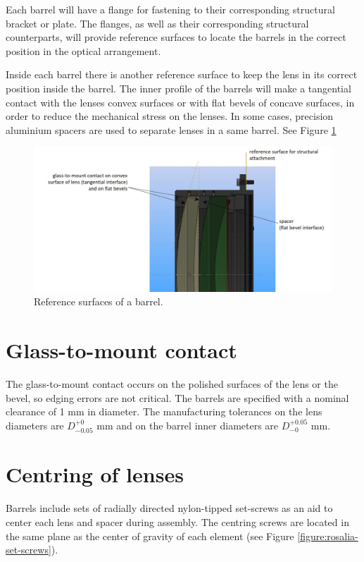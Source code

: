 \documentclass{report}
\begin{document}
Each barrel will have a flange for fastening to their corresponding structural bracket or plate. The flanges, as well as their corresponding structural counterparts, will provide reference surfaces to locate the barrels in the correct position in the optical arrangement.

Inside each barrel there is another reference surface to keep the lens in its correct position inside the barrel. The inner profile of the barrels will make a tangential contact with the lenses convex surfaces or with flat bevels of concave surfaces, in order to reduce the mechanical stress on the lenses. In some cases, precision aluminium spacers are used to separate lenses in a same barrel. See Figure \ref{figure:Refsurfaces}

\begin{figure}
\begin{center}
\includegraphics[width=0.7\linewidth]{figures/Reference-surfaces.jpg}
\end{center}
\caption{Reference surfaces of a barrel.}
\label{figure:Refsurfaces}
\end{figure}


\section{Glass-to-mount contact}

The glass-to-mount contact occurs on the polished surfaces of the lens or the bevel, so edging errors are not critical. The barrels are specified with a nominal clearance of 1 mm in diameter. The manufacturing tolerances on the lens diameters are $D^{+0} _{-0.05}$ mm and on the barrel inner diameters are $D^{+0.05} _{-0}$ mm.

\section{Centring of lenses}
 
Barrels include sets of radially directed nylon-tipped set-screws as an aid to center each lens and spacer during assembly. The centring screws are located in the same plane as the center of gravity of each element (see Figure \ref{figure:rosalia-set-screws}).
\end{document}
